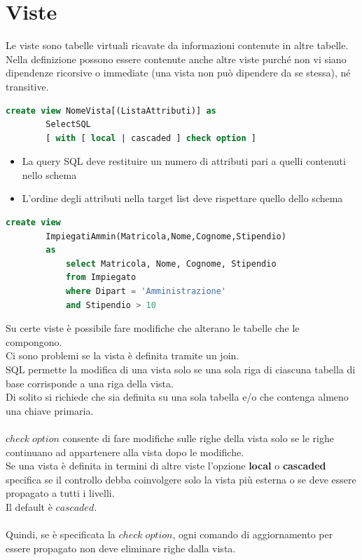 \documentclass{article}
\begin{document}
	\section{Viste}
	Le viste sono tabelle virtuali ricavate da informazioni contenute in altre tabelle.\\
	Nella definizione possono essere contenute anche altre viste purché non vi siano dipendenze ricorsive o immediate (una vista non può dipendere da se stessa), né transitive.
	\begin{lstlisting}[language=SQL]
		create view NomeVista[(ListaAttributi)] as
		SelectSQL
		[ with [ local | cascaded ] check option ]
	\end{lstlisting}
	\begin{itemize}
		\item La query SQL deve restituire un numero di attributi pari a quelli contenuti nello schema
		\item L'ordine degli attributi nella target list deve rispettare quello dello schema
	\end{itemize}
	\begin{lstlisting}[language=SQL]
		create view
		ImpiegatiAmmin(Matricola,Nome,Cognome,Stipendio)
		as
			select Matricola, Nome, Cognome, Stipendio
			from Impiegato
			where Dipart = 'Amministrazione'
			and Stipendio > 10
	\end{lstlisting}
	Su certe viste è possibile fare modifiche che alterano le tabelle che le compongono. \\
	Ci sono problemi se la vista è definita tramite un join.\\
	SQL permette la modifica di una vista solo se una sola riga di ciascuna tabella di base corrisponde a una riga della vista. \\
	Di solito si richiede che sia definita su una sola tabella e/o che contenga almeno una chiave primaria.\\\\
	$check \; option$ consente di fare modifiche sulle righe della vista solo se le righe continuano ad appartenere alla vista dopo le modifiche.\\
	Se una vista è definita in termini di altre viste l'opzione \textbf{local} o \textbf{cascaded} specifica se il controllo debba coinvolgere solo la vista più esterna o se deve essere propagato a tutti i livelli.\\
	Il default è $cascaded$.\\\\
	Quindi, se è specificata la $check \; option$, ogni comando di aggiornamento per essere propagato non deve eliminare righe dalla vista.\\\\
\end{document}
